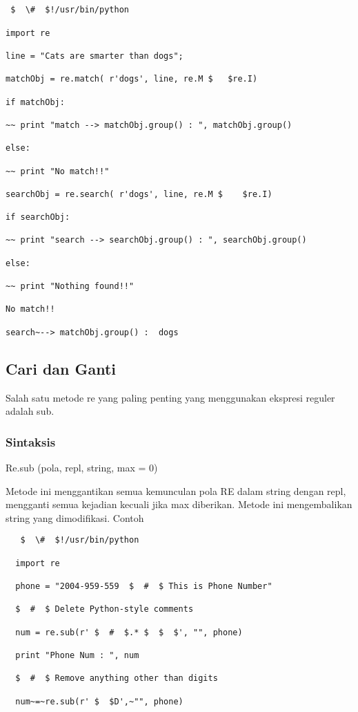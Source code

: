 \begin {enumerate}
\begin {enumerate}
\begin{verbatim}


 $  \#  $!/usr/bin/python

import re

line = "Cats are smarter than dogs";

matchObj = re.match( r'dogs', line, re.M $   $re.I)

if matchObj:

~~ print "match --> matchObj.group() : ", matchObj.group()

else:

~~ print "No match!!"

searchObj = re.search( r'dogs', line, re.M $    $re.I)

if searchObj:

~~ print "search --> searchObj.group() : ", searchObj.group()

else:

~~ print "Nothing found!!"

No match!!

search~--> matchObj.group() :  dogs
\end{verbatim}


\subsection{Cari dan Ganti}
Salah satu metode re yang paling penting yang menggunakan ekspresi reguler adalah sub.

  \subsubsection{Sintaksis}
  Re.sub (pola, repl, string, max = 0)

  Metode ini menggantikan semua kemunculan pola RE dalam string dengan repl, mengganti semua kejadian kecuali jika max diberikan. Metode ini mengembalikan string yang dimodifikasi.
  Contoh
  \begin{verbatim}
   $  \#  $!/usr/bin/python

  import re

  phone = "2004-959-559  $  #  $ This is Phone Number"

  $  #  $ Delete Python-style comments

  num = re.sub(r' $  #  $.* $  $  $', "", phone)

  print "Phone Num : ", num

  $  #  $ Remove anything other than digits

  num~=~re.sub(r' $  $D',~"", phone)


\end{verbatim}
\end{enumerate}
\end{enumerate}
